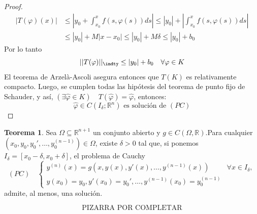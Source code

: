 \documentclass[11pt]{article}
\theoremstyle{definition} %
\newtheorem{theorem}{Teorema}[section]
\newcommand{\R}{\mathbb{R}}
\begin{document}
\begin{proof}
    \[
      \begin{align*}
        |T(\varphi)(x)| &\leq \left| y_0 + \int_{x_0}^{x} f(s,\varphi(s)) ds \right| \leq |y_0| + \left|  \int_{x_0}^{x} f(s,\varphi(s)) ds \right| \\
        & \leq |y_0| + M|x - x_0| \leq  |y_0| + M\delta \leq |y_0| + b_0
      \end{align*}
    \] 
  Por lo tanto \[ ||T(\varphi)||_{\indty} \leq |y_0| + b_0 \quad \forall \varphi \in K\] El teorema de Arzelà-Ascoli asegura entonces que $T(K)$ es relativamente compacto. Luego, se cumplen todas las hipótesis del teorema de punto fijo de Schauder, y así,  $(\exists \hat{\varphi} \in K) \quad T(\hat{\varphi}) = \hat{\varphi}$, entonces: \[ \hat{\varphi} \in C(I_{\delta};\R^n) \text{ es solución de } (PC) \]
\end{proof}
\begin{theorem}
  Sea $\Omega \subseteq \mathbb{R}^{n+1}$ un conjunto abierto y $g \in C(\Omega, \mathbb{R})$.Para cualquier $(x_0, y_0, y_0', \dots, y_0^{(n-1)}) \in \Omega$, existe $\delta > 0$ tal que, si ponemos $I_\delta = [x_0 - \delta, x_0 + \delta]$, el problema de Cauchy
  \[
    (PC) \quad \begin{cases}
    y^{(n)}(x) = g(x, y(x), y'(x), \dots, y^{(n-1)}(x)) & \forall x \in I_\delta, \\
    y(x_0) = y_0, y'(x_0) = y_0', \dots, y^{(n-1)}(x_0) = y_0^{(n-1)}
    \end{cases}
  \]
  admite, al menos, una solución.
\end{theorem}
\[
  \text{PIZARRA POR COMPLETAR}
\]
\end{document}
